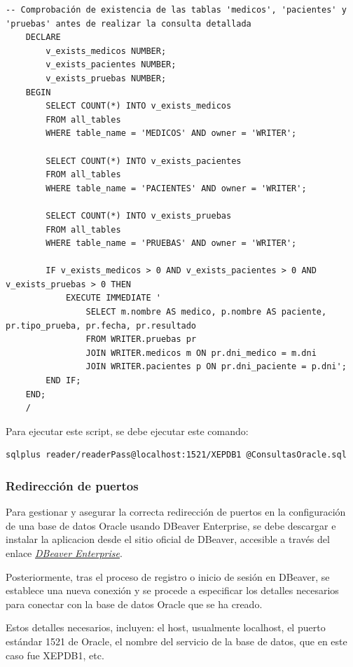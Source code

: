 \documentclass{article}
\begin{document}
\begin{lstlisting}[style=bashStyle]
    -- Comprobación de existencia de las tablas 'medicos', 'pacientes' y 'pruebas' antes de realizar la consulta detallada
    DECLARE
        v_exists_medicos NUMBER;
        v_exists_pacientes NUMBER;
        v_exists_pruebas NUMBER;
    BEGIN
        SELECT COUNT(*) INTO v_exists_medicos
        FROM all_tables
        WHERE table_name = 'MEDICOS' AND owner = 'WRITER';
    
        SELECT COUNT(*) INTO v_exists_pacientes
        FROM all_tables
        WHERE table_name = 'PACIENTES' AND owner = 'WRITER';
    
        SELECT COUNT(*) INTO v_exists_pruebas
        FROM all_tables
        WHERE table_name = 'PRUEBAS' AND owner = 'WRITER';
    
        IF v_exists_medicos > 0 AND v_exists_pacientes > 0 AND v_exists_pruebas > 0 THEN
            EXECUTE IMMEDIATE '
                SELECT m.nombre AS medico, p.nombre AS paciente, pr.tipo_prueba, pr.fecha, pr.resultado
                FROM WRITER.pruebas pr
                JOIN WRITER.medicos m ON pr.dni_medico = m.dni
                JOIN WRITER.pacientes p ON pr.dni_paciente = p.dni';
        END IF;
    END;
    /
\end{lstlisting}

Para ejecutar este script, se debe ejecutar este comando:
\begin{lstlisting}[style=bashStyle]
sqlplus reader/readerPass@localhost:1521/XEPDB1 @ConsultasOracle.sql
\end{lstlisting}

\subsubsection{Redirección de puertos}

Para gestionar y asegurar la correcta redirección de puertos en la configuración de una base de datos Oracle usando DBeaver Enterprise, se debe descargar e instalar la aplicacion desde el sitio oficial de DBeaver, accesible a través del enlace \textit{\textcolor{blue}{\href{https://dbeaver.com/download/enterprise/}{DBeaver Enterprise}}}. 

Posteriormente, tras el proceso de registro o inicio de sesión en DBeaver, se establece una nueva conexión y se procede a especificar los detalles necesarios para conectar con la base de datos Oracle que se ha creado. 

Estos detalles necesarios, incluyen: el host, usualmente localhost, el puerto estándar 1521 de Oracle, el nombre del servicio de la base de datos, que en este caso fue XEPDB1, etc. 
\end{document}
